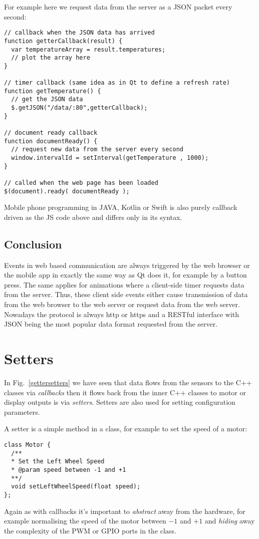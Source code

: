 \documentclass[12pt]{report}
\begin{document}
For example here we request data from the server as a JSON
packet every second:

\begin{verbatim}
// callback when the JSON data has arrived
function getterCallback(result) {
  var temperatureArray = result.temperatures;
  // plot the array here
}

// timer callback (same idea as in Qt to define a refresh rate)
function getTemperature() {
  // get the JSON data
  $.getJSON("/data/:80",getterCallback);
}

// document ready callback
function documentReady() {
  // request new data from the server every second
  window.intervalId = setInterval(getTemperature , 1000);
}

// called when the web page has been loaded
$(document).ready( documentReady );
\end{verbatim}

Mobile phone programming in JAVA, Kotlin or Swift is also purely
callback driven as the JS code above and differs only in its syntax.

\section{Conclusion}
Events in web based communication are always triggered by the web
browser or the mobile app in exactly the same way as Qt does it, for
example by a button press. The same applies for animations where a
client-side timer requests data from the server. Thus, these client
side events either cause transmission of data from the web browser to
the web server or request data from the web server. Nowadays the protocol is
always http or https and a RESTful interface with JSON
being the most popular data format requested from the server.


\chapter{Setters}
In Fig.~\ref{gettersetters} we have seen that data flows from
the sensors to the C++ classes via \textsl{callbacks} then it flows
back from the inner C++ classes to motor or display outputs is via
\textsl{setters}. Setters are also used for setting configuration
parameters.

A setter is a simple method in a class, for example to set the
speed of a motor:
\begin{verbatim}
class Motor {
  /**
  * Set the Left Wheel Speed
  * @param speed between -1 and +1
  **/
  void setLeftWheelSpeed(float speed);
};
\end{verbatim}
Again as with callbacks it's important to \textsl{abstract} away from the
hardware, for example normalising the speed of the
motor between $-1$ and $+1$ and \textsl{hiding} away the complexity of the
PWM or GPIO ports in the class.
\end{document}
